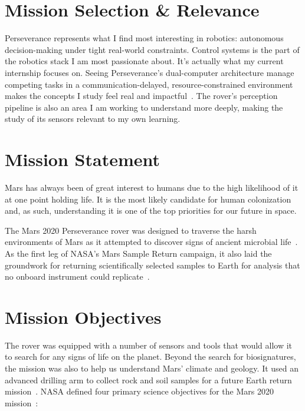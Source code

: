 \documentclass[11pt]{article}
\begin{document}
\section*{Mission Selection \& Relevance}
Perseverance represents what I find most interesting
in robotics: autonomous decision-making under tight real-world constraints. Control systems is the
part of the robotics stack I am most passionate about. It's actually what my current internship focuses on. Seeing
Perseverance's dual-computer architecture manage competing tasks in a communication-delayed,
resource-constrained environment makes the concepts I study feel real and impactful~\cite{science_robotics}. The rover's perception pipeline is also an area I am working to understand
more deeply, making the study of its sensors relevant to my own learning.

\section*{Mission Statement}
Mars has always been of great interest to humans due to the high likelihood of it at one point
holding life. It is the most likely candidate for human colonization and, as such, understanding
it is one of the top priorities for our future in space.

The Mars 2020 Perseverance rover was designed to traverse the harsh environments of Mars as it
attempted to discover signs of ancient microbial life~\cite{rover_components}. As the first leg of
NASA's Mars Sample Return campaign, it also laid the groundwork for returning scientifically
selected samples to Earth for analysis that no onboard instrument could replicate~\cite{mars2020_wiki}.

\section*{Mission Objectives}
The rover was equipped with a number of sensors
and tools that would allow it to search for any signs of life on the planet. Beyond the search for biosignatures,
the mission was also to help us understand Mars' climate and geology. It used an advanced drilling arm
to collect rock and soil samples for a future Earth return mission~\cite{rover_components}.
NASA defined four primary science objectives for the Mars 2020 mission~\cite{rover_components}:
\end{document}
